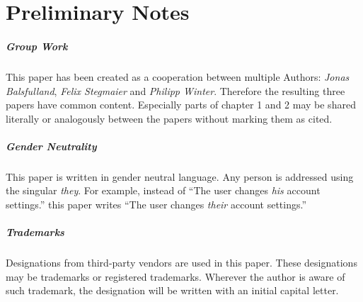 \clearpage
\chapter*{Preliminary Notes}
\label{chap:prenotes}
\thispagestyle{scrheadings}


\paragraph{Group Work}
This paper has been created as a cooperation between multiple Authors: 
\emph{Jonas Balsfulland}, \emph{Felix Stegmaier} and \emph{Philipp Winter}.
Therefore the resulting three papers have common content.
Especially parts of chapter 1 and 2 may be shared literally or analogously between the papers without marking them as cited.

\paragraph{Gender Neutrality}
This paper is written in gender neutral language.
Any person is addressed using the singular \emph{they}.
For example, instead of 
``The user changes \emph{his} account settings.''
this paper writes 
``The user changes \emph{their} account settings.''

\paragraph{Trademarks}
Designations from third-party vendors are used in this paper.
These designations may be trademarks or registered trademarks.
Wherever the author is aware of such trademark, 
the designation will be written with an initial capital letter.


